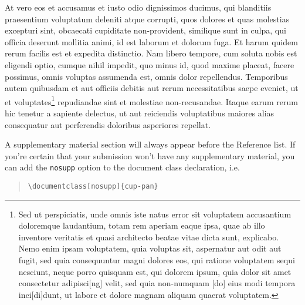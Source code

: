 \documentclass{cup-pan}
\begin{document}
At vero eos et accusamus et iusto odio dignissimos ducimus, qui
blanditiis praesentium voluptatum deleniti atque corrupti, quos
dolores et quas molestias excepturi sint, obcaecati cupiditate
non-provident, similique sunt in culpa, qui officia deserunt mollitia
animi, id est laborum et dolorum fuga. Et harum quidem rerum facilis
est et expedita distinctio. Nam libero tempore, cum soluta nobis est
eligendi optio, cumque nihil impedit, quo minus id, quod maxime
placeat, facere possimus, omnis voluptas assumenda est, omnis dolor
repellendus. Temporibus autem quibusdam et aut officiis debitis aut
rerum necessitatibus saepe eveniet, ut et voluptates\footnote{Sed ut
perspiciatis, unde omnis iste natus error sit voluptatem accusantium
doloremque laudantium, totam rem aperiam eaque ipsa, quae ab illo
inventore veritatis et quasi architecto beatae vitae dicta sunt,
explicabo. Nemo enim ipsam voluptatem, quia voluptas sit, aspernatur
aut odit aut fugit, sed quia consequuntur magni dolores eos, qui
ratione voluptatem sequi nesciunt, neque porro quisquam est, qui
dolorem ipsum, quia dolor sit amet consectetur adipisci[ng] velit, sed
quia non-numquam [do] eius modi tempora inci[di]dunt, ut labore et
dolore magnam aliquam quaerat voluptatem.} repudiandae sint et
molestiae non-recusandae. Itaque earum rerum hic tenetur a sapiente
delectus, ut aut reiciendis voluptatibus maiores alias consequatur aut
perferendis doloribus asperiores repellat.

\blinddocument

A supplementary material section will always appear before the
Reference list. If you're certain that your submission won't have any
supplementary material, you can add the \texttt{nosupp} option to the
document class declaration, i.e.

\begin{quote}
\verb|\documentclass[nosupp]{cup-pan}|
\end{quote}

\printbibliography
\end{document}
